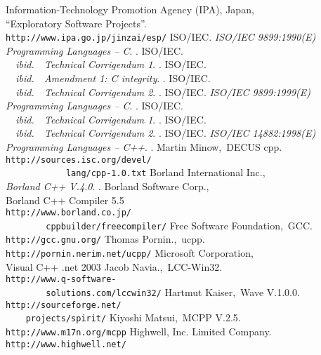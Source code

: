 \documentclass[twocolumn]{article}
\begin{document}
\renewcommand{\refname}{Related Materials and URL}
\begin{thebibliography}{99a}
  Information-Technology Promotion Agency (IPA), Japan, \\
  ``Exploratory Software Projects''.\\
  \verb|http://www.ipa.go.jp/jinzai/esp/|
  ISO/IEC.
  \newblock \textit{ISO/IEC 9899:1990(E) Programming Languages -- C}.
  .
  ISO/IEC.\\
  \newblock \textit{~~ibid.~~Technical Corrigendum 1}.
  .
  ISO/IEC.\\
  \newblock \textit{~~ibid.~~Amendment 1: C integrity}.
  .
  ISO/IEC.\\
  \newblock \textit{~~ibid.~~Technical Corrigendum 2}.
  .
  ISO/IEC.
  \newblock \textit{ISO/IEC 9899:1999(E) Programming Languages -- C}.
  .
  ISO/IEC.\\
  \newblock \textit{~~ibid.~~Technical Corrigendum 1}.
  .
  ISO/IEC.\\
  \newblock \textit{~~ibid.~~Technical Corrigendum 2}.
  .
  ISO/IEC.
  \newblock \textit{ISO/IEC 14882:1998(E) Programming Languages -- C++}.
  .
  Martin Minow,~DECUS cpp.\\
  \verb|http://sources.isc.org/devel/|\\
  \verb|            lang/cpp-1.0.txt|
  Borland International Inc.,\\
  \newblock \textit{Borland C++ V.4.0}.
  .
  Borland Software Corp.,\\
  Borland C++ Compiler 5.5\\
  \verb|http://www.borland.co.jp/|\\
  \verb|        cppbuilder/freecompiler/|
  Free Software Foundation,~GCC.\\
  \newblock \verb|http://gcc.gnu.org/|
  Thomas Pornin.,~ucpp.\\
  \newblock \verb|http://pornin.nerim.net/ucpp/|
  Microsoft Corporation,\\
  Visual C++ .net 2003
  Jacob Navia.,~LCC-Win32.\\
  \verb|http://www.q-software-|\\
  \verb|        solutions.com/lccwin32/|
  Hartmut Kaiser,~Wave V.1.0.0.\\
  \newblock \verb|http://sourceforge.net/|\\
  \newblock \verb|    projects/spirit/|
  Kiyoshi Matsui,~MCPP V.2.5.\\
  \newblock \verb|http://www.m17n.org/mcpp|
  Highwell, Inc. Limited Company.\\
  \newblock \verb|http://www.highwell.net/|
\end{thebibliography}
\end{document}
